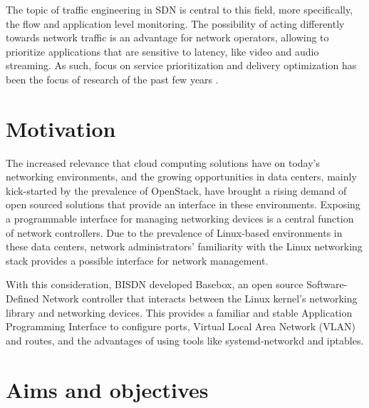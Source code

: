 \par The topic of traffic engineering in SDN is central to this field, more specifically, the flow and application level monitoring.  The possibility of acting
differently towards network traffic is an advantage for network operators, allowing to prioritize applications that are
sensitive to latency, like video and audio streaming. As such, focus on service prioritization and delivery optimization has been the focus of research 
of the past few years \cite{bakhshi_user-centric_2017}.

\section {Motivation}


The increased relevance that cloud computing solutions have on today's networking environments, and the growing opportunities in data centers, mainly
kick-started by the prevalence of OpenStack, have brought a rising demand of open sourced solutions that provide an interface in these environments. Exposing
a programmable interface for managing networking devices is a central function of network controllers. Due to the prevalence of Linux-based environments in these
data centers, network administrators' familiarity with the Linux networking stack provides a possible interface for network management.

\par With this consideration, BISDN developed Basebox, an open source Software-Defined Network controller that interacts between the Linux kernel's networking
library and networking devices. This provides a familiar and stable Application Programming Interface to configure ports, Virtual Local Area Network (VLAN) 
and routes, and the advantages of using tools like systemd-networkd and iptables.

\section {Aims and objectives}



